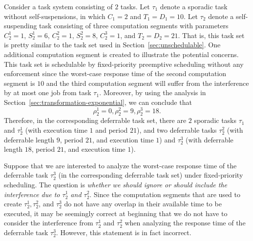 Consider a task system consisting of $2$ tasks. Let $\tau_1$ denote a sporadic task without self-suspensions, in which $C_1 = 2$ and $T_1=D_1=10$. Let $\tau_2$ denote a self-suspending task consisting of three computation segments with parameters  $C_2^1 = 1$,  $S_2^1 = 6$, $C_2^2=1$, $S_2^2=8$, $C_2^3=1$, and $ T_2=D_2=21$. That is, this task set is pretty similar to the task set used in Section~\ref{sec:unschedulable}. One additional computation
segment is created to illustrate the potential concerns. This task set is schedulable by fixed-priority preemptive scheduling without any enforcement since the worst-case response time of the second computation segment is $10$ and the third computation segment will suffer from the interference by at most one job from task $\tau_1$. Moreover, by using the analysis in Section~\ref{sec:transformation-exponential}, we can conclude that
\begin{equation*}
  \rho_2^1 = 0, \rho_2^2 = 9, \rho_2^3 = 18.
\end{equation*}
Therefore, in the corresponding deferrable task set, there are $2$ sporadic tasks $\tau_1$ and $\tau_2^1$ (with execution time $1$ and period $21$), and two deferrable tasks $\tau_2^2$ (with deferrable length $9$, period $21$, and execution time $1$) and $\tau_2^3$ (with deferrable length $18$, period $21$, and execution time $1$).  

Suppose that we are interested to analyze the worst-case response time of the deferrable task $\tau_2^3$ (in the corresponding deferrable task set) under fixed-priority scheduling. The question is \emph{whether we should ignore or should include the interference due to $\tau_2^1$ and $\tau_2^2$}.
Since the computation segments that are used to create $\tau_2^1, \tau_2^2$, and $\tau_2^3$ do not have any overlap in their available time to be executed, it may be seemingly correct at beginning that we do not have to consider the interference from $\tau_2^1$ and $\tau_2^2$ when analyzing the response time of the deferrable task $\tau_2^3$. However, this statement is in fact incorrect.


